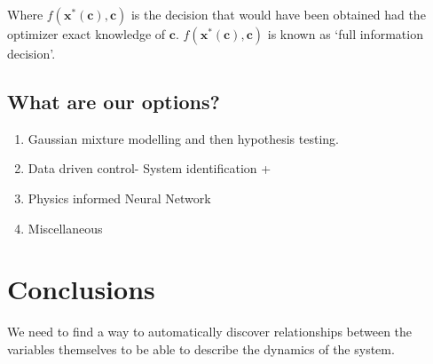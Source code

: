 \documentclass[12pt, letterpaper]{article}
\begin{document}
Where $f(\mathbf{x}^*(\mathbf{c}), \mathbf{c})$ is the decision that would have been obtained had the optimizer 
exact knowledge of $\mathbf{c}$. $f(\mathbf{x}^*(\mathbf{c}), \mathbf{c})$ is known as `full information 
decision'.

\subsection{What are our options?}

\begin{enumerate}
    \item Gaussian mixture modelling and then hypothesis testing.
    \item Data driven control- System identification + 
    \item Physics informed Neural Network
    \item Miscellaneous
\end{enumerate}

\section{Conclusions}
We need to find a way to automatically discover relationships between the variables themselves to be able to 
describe the dynamics of the system.
\end{document}
